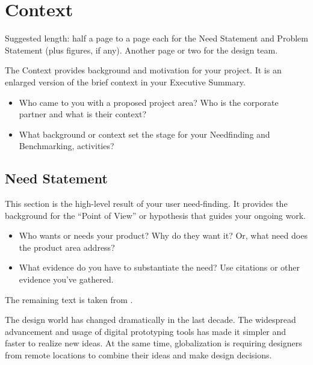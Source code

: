 \chapter{Context}
\label{sec-context} %

\begin{remark} \color{blue}
Suggested length: half a page to a page each for the Need Statement and Problem Statement (plus figures, if any). Another page or two for the design team.
\vspace{0.1in}

\noindent The Context provides background and motivation for your project. It is an enlarged version of the brief context in your Executive Summary.  
\begin{itemize} \tightlist
\item Who came to you with a proposed project area? Who is the corporate partner and what is their context?
\item What background or context set the stage for your Needfinding and Benchmarking, activities?
\end{itemize}
\normalcolor \end{remark}

\section{Need Statement}
\label{sec:need}

\begin{remark} \color{blue}
This section is the high-level result of your user need-finding. It provides the background for the ``Point of View'' or hypothesis that guides your ongoing work. 
\begin{itemize} \tightlist
\item Who wants or needs your product? Why do they want it? Or, what need does the product area address? 
\item What evidence do you have to substantiate the need? Use citations or other evidence you've gathered.
\end{itemize}

\noindent The remaining text is taken from \cite{Autodesk2008Fall}.
\normalcolor \end{remark}

The design world has changed dramatically in the last decade. The widespread advancement and usage of digital prototyping tools has made it simpler and faster to realize new ideas. At the same time, globalization is requiring designers from remote locations to combine their ideas and make design decisions. 

